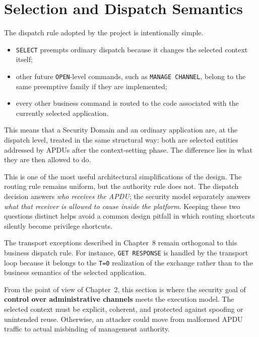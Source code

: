 \section{Selection and Dispatch Semantics}
\label{sec:system-selection-dispatch}


The dispatch rule adopted by the project is intentionally simple.

\begin{itemize}
\item \texttt{SELECT} preempts ordinary dispatch because it changes the
  selected context itself;
\item other future \texttt{OPEN}-level commands, such as
  \texttt{MANAGE CHANNEL}, belong to the same preemptive family if they
  are implemented;
\item every other business command is routed to the code associated with
  the currently selected application.
\end{itemize}

This means that a Security Domain and an ordinary application are, at the
dispatch level, treated in the same structural way: both are selected
entities addressed by APDUs after the context-setting phase. The
difference lies in what they are then allowed to do.

This is one of the most useful architectural simplifications of the
design. The routing rule remains uniform, but the authority rule does
not. The dispatch decision answers \emph{who receives the APDU}; the
security model separately answers \emph{what that receiver is allowed to
cause inside the platform}. Keeping these two questions distinct helps
avoid a common design pitfall in which routing shortcuts silently become
privilege shortcuts.

The transport exceptions described in Chapter~8 remain orthogonal to this
business dispatch rule. For instance, \texttt{GET RESPONSE} is handled by
the transport loop because it belongs to the \texttt{T=0} realization of
the exchange rather than to the business semantics of the selected
application.

From the point of view of Chapter~2, this section is where the security
goal of \textbf{control over administrative channels} meets the execution
model. The selected context must be explicit, coherent, and protected
against spoofing or unintended reuse. Otherwise, an attacker could move
from malformed APDU traffic to actual misbinding of management authority.

